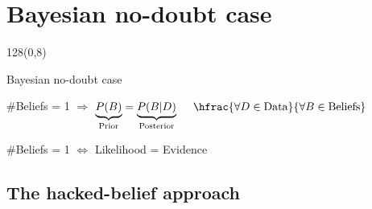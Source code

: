 \documentclass[shownotes]{beamer}
\begin{document}
\section{Bayesian no-doubt case}

\begin{frame}
 \begin{textblock}{128}(0,8)
\begin{center}
 \Large Bayesian no-doubt case
\end{center}
\end{textblock}
\vspace{0.5cm}


 \begin{mdframed}[backgroundcolor=black!15]
 \centering
 $\#$Beliefs = 1 $\Longrightarrow$ $\underbrace{P(B)}_{\text{\scriptsize Prior}} = \underbrace{P(B|D)}_{\text{\scriptsize Posterior}} \ \ \ \ \hfrac{\forall D \in \text{Data}}{\forall B \in \text{Beliefs}}$
\end{mdframed}

 \vspace{0.9cm}
\pause 


\begin{mdframed}[backgroundcolor=black!15]
\centering
 $\#$Beliefs = 1  $\Longleftrightarrow$ Likelihood = Evidence  
\end{mdframed}
 

 

\end{frame}



\subsection{The hacked-belief approach}
\end{document}
